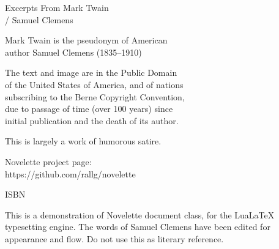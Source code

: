 \documentclass[../../demo.tex]{novelette-subdoc}
\begin{document}
\begin{pageiii} %
\null\null\null\null\null %
\null\null\null %
\vfill %
\end{pageiii}

\begin{pageiv} %
Excerpts From Mark Twain\\/ Samuel Clemens\par
Mark Twain is the pseudonym of American\\
author Samuel Clemens (1835--1910)\par
The text and image are in the Public Domain\\
of the United States of America, and of nations\\
subscribing to the Berne Copyright Convention,\\
due to passage of time (over 100 years) since\\
initial publication and the death of its author.\par
This is largely a work of humorous satire.\par
Novelette project page:\\https://github.com/rallg/novelette\par
ISBN \par
\end{pageiv}

\begin{pagev} %
\null\null\null\null\null %
\null\null\null\null\null %
\begin{blockindent}[4,4] %
\noindent This is a demonstration of Novelette document
class, for the LuaLaTeX typesetting engine.
The words of Samuel Clemens have been edited for appearance and flow.
Do not use this as literary reference.\par
\end{blockindent}
\end{pagev}

\end{document}
